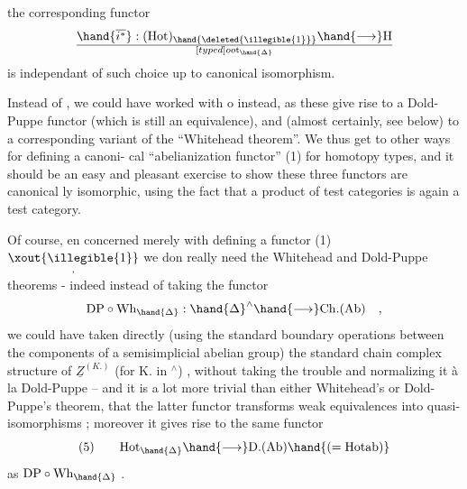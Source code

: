 
 the corresponding functor
\[ \hand{\overline{i^*}} : (\mathrm{Hot})_{\hand{\deleted{\illegible{1}}}} \hand{\longrightarrow} \mathrm{H}\over[typed]{o}{o}\mathrm{t}_{\hand{\Delta}} \]
is independant of such choice\hand{,} up to canonical isomorphism.

Instead of \hand{$\Delta$} , we could have worked with \hand{$\Box$} o  instead, as
these give rise to a Dold-Puppe functor (which is still an equivalence),
and (almost certainly, see below) to a corresponding variant of the
``Whitehead theorem''. We thus get to other ways for defining a canoni-%
cal ``abelianization functor'' (1) for homotopy types, and it should be
an easy and pleasant exercise to show these three functors are canonical%
ly  isomorphic, using the fact that a product of test categories
is again a test category.

 Of course, en concerned merely with defining a functor (1)$\underset{,}{\text{\xout{\illegible{1}}}}$
we don really need the Whitehead and Dold-Puppe theorems - indeed
instead of taking the functor
\[ \mathrm{DP} \circ \mathrm{Wh}_{\hand{\Delta}} : \hand{\Delta}^{\wedge} \hand{\longrightarrow} \mathrm{Ch.(Ab)} \quad , \]
we could have taken directly (using the standard boundary operations
between the components of a semisimplicial abelian group) the standard
 chain complex structure of $\underline{Z}^{(K.)}$ (for K. in \hand{$\Delta$}$^{\wedge}$) , without
taking the trouble and normalizing it à la Dold-Puppe -- and it is
a lot more trivial than either Whitehead's or Dold-Puppe's theorem,
that the latter functor transforms  weak equivalences into
quasi-isomorphisms ;  moreover it gives rise to the same functor
\[ (5) \qquad \mathrm{Hot}_{\hand{\Delta}} \hand{\longrightarrow} \mathrm{D.(Ab)}\hand{(=\mathrm{Hotab})} \]
as $\mathrm{DP}\circ\mathrm{Wh}_{\hand{\Delta}}$ .


